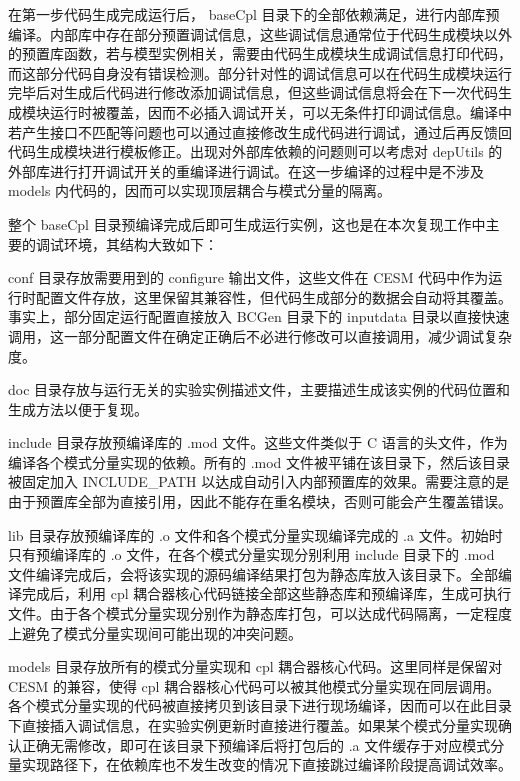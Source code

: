 在第一步代码生成完成运行后， baseCpl 目录下的全部依赖满足，进行内部库预编译。内部库中存在部分预置调试信息，这些调试信息通常位于代码生成模块以外的预置库函数，若与模型实例相关，需要由代码生成模块生成调试信息打印代码，而这部分代码自身没有错误检测。部分针对性的调试信息可以在代码生成模块运行完毕后对生成后代码进行修改添加调试信息，但这些调试信息将会在下一次代码生成模块运行时被覆盖，因而不必插入调试开关，可以无条件打印调试信息。编译中若产生接口不匹配等问题也可以通过直接修改生成代码进行调试，通过后再反馈回代码生成模块进行模板修正。出现对外部库依赖的问题则可以考虑对 depUtils 的外部库进行打开调试开关的重编译进行调试。在这一步编译的过程中是不涉及 models 内代码的，因而可以实现顶层耦合与模式分量的隔离。

整个 baseCpl 目录预编译完成后即可生成运行实例，这也是在本次复现工作中主要的调试环境，其结构大致如下：

conf 目录存放需要用到的 configure 输出文件，这些文件在 CESM 代码中作为运行时配置文件存放，这里保留其兼容性，但代码生成部分的数据会自动将其覆盖。事实上，部分固定运行配置直接放入 BCGen 目录下的 inputdata 目录以直接快速调用，这一部分配置文件在确定正确后不必进行修改可以直接调用，减少调试复杂度。

doc 目录存放与运行无关的实验实例描述文件，主要描述生成该实例的代码位置和生成方法以便于复现。

include 目录存放预编译库的 .mod 文件。这些文件类似于 C 语言的头文件，作为编译各个模式分量实现的依赖。所有的 .mod 文件被平铺在该目录下，然后该目录被固定加入 INCLUDE\_PATH 以达成自动引入内部预置库的效果。需要注意的是由于预置库全部为直接引用，因此不能存在重名模块，否则可能会产生覆盖错误。

lib 目录存放预编译库的 .o 文件和各个模式分量实现编译完成的 .a 文件。初始时只有预编译库的 .o 文件，在各个模式分量实现分别利用 include 目录下的 .mod 文件编译完成后，会将该实现的源码编译结果打包为静态库放入该目录下。全部编译完成后，利用 cpl 耦合器核心代码链接全部这些静态库和预编译库，生成可执行文件。由于各个模式分量实现分别作为静态库打包，可以达成代码隔离，一定程度上避免了模式分量实现间可能出现的冲突问题。

models 目录存放所有的模式分量实现和 cpl 耦合器核心代码。这里同样是保留对 CESM 的兼容，使得 cpl 耦合器核心代码可以被其他模式分量实现在同层调用。各个模式分量实现的代码被直接拷贝到该目录下进行现场编译，因而可以在此目录下直接插入调试信息，在实验实例更新时直接进行覆盖。如果某个模式分量实现确认正确无需修改，即可在该目录下预编译后将打包后的 .a 文件缓存于对应模式分量实现路径下，在依赖库也不发生改变的情况下直接跳过编译阶段提高调试效率。

